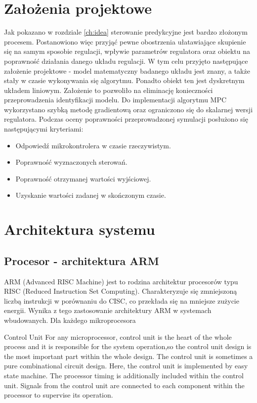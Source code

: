 \section{Założenia projektowe} \label{sec:assumptions}
Jak pokazano w rozdziale \ref{ch:idea} sterowanie predykcyjne jest bardzo złożonym procesem.
Postanowiono więc przyjąć pewne obostrzenia ułatawiające skupienie się na samym sposobie regulacji, 
wpływie parametrów regulatora oraz obiektu na poprawność działania danego układu regulacji. W tym
celu przyjęto następujące założenie projektowe - model matematyczny badanego układu jest znany, a
także stały w czasie wykonywania się algorytmu. Ponadto obiekt ten jest dyskretnym układem liniowym.
Założenie to pozwoliło na eliminację konieczności przeprowadzenia identyfikacji modelu. Do
implementacji algorytmu MPC wykorzystano szybką metodę gradientową oraz ograniczono się do skalarnej
wersji regulatora.
Podczas oceny poprawności przeprowadzonej symulacji posłużono się następującymi kryteriami:  
\begin{itemize}
	\item Odpowiedź mikrokontrolera w czasie rzeczywistym.
    \item Poprawność wyznaczonych sterowań.
    \item Poprawność otrzymanej wartości wyjściowej.
    \item Uzyskanie wartości zadanej w skończonym czasie.
\end{itemize}

\section{Architektura systemu} \label{sec:system}

\subsection{Procesor - architektura ARM} \label{sec:arm}
ARM (Advanced RISC Machine) jest to rodzina architektur procesorów typu RISC (Reduced Instruction
Set Computing). Charakteryzuje się zmniejszoną liczbą instrukcji w porównaniu do CISC, co
przekłada się na mniejsze zużycie energii. Wynika z tego zastosowanie architektury ARM
w systemach wbudowanych. Dla każdego mikroprocesora 

Control Unit
For any microprocessor, control unit is the heart of the whole process and it is responsible 
for the system operation,so the control unit design is the most important part within the whole
 design. The control unit is sometimes a pure combinational circuit design. Here, the control
  unit is implemented by easy state machine. The processor timing is additionally included within
   the control unit. Signals from the control unit are connected to each component within the 
   processor to supervise its operation.

